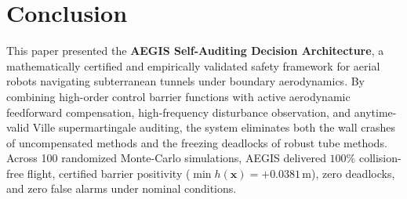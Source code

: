 \documentclass[11pt,a4paper]{article}
\begin{document}
\section{Conclusion}
\label{sec:conclusion}
This paper presented the \textbf{AEGIS Self-Auditing Decision Architecture}, a mathematically certified and empirically validated safety framework for aerial robots navigating subterranean tunnels under boundary aerodynamics. By combining high-order control barrier functions with active aerodynamic feedforward compensation, high-frequency disturbance observation, and anytime-valid Ville supermartingale auditing, the system eliminates both the wall crashes of uncompensated methods and the freezing deadlocks of robust tube methods. Across 100 randomized Monte-Carlo simulations, AEGIS delivered $100\%$ collision-free flight, certified barrier positivity ($\min h(\mathbf{x}) = +0.0381\,$m), zero deadlocks, and zero false alarms under nominal conditions.



\end{document}
